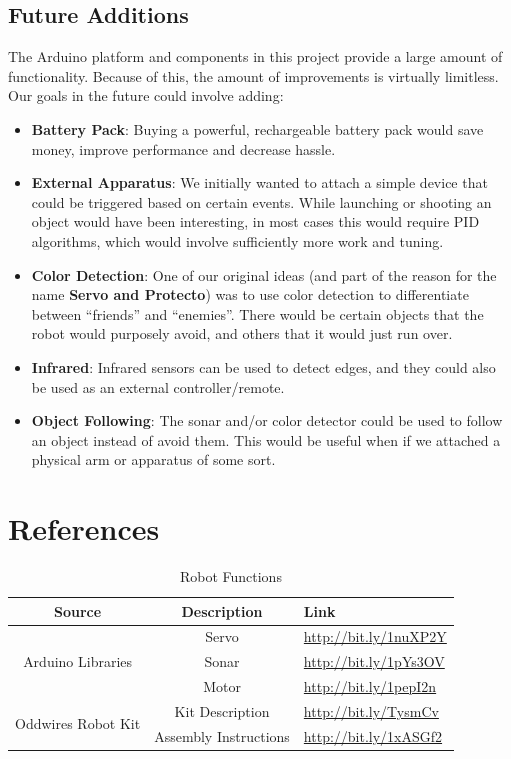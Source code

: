 \documentclass[11pt]{article}
\begin{document}
\subsection{Future Additions}
The Arduino platform and components in this project provide a large amount of functionality.  Because of this, the amount of improvements is virtually limitless.  Our goals in the future could involve adding:
		\begin{itemize}				
		\item \textbf{Battery Pack}: Buying a powerful, rechargeable battery pack would save money, improve performance and decrease hassle.
		\item \textbf{External Apparatus}: We initially wanted to attach a simple device that could be triggered based on certain events.  While launching or shooting an object would have been interesting, in most cases this would require PID algorithms, which would involve sufficiently more work and tuning.
		\item \textbf{Color Detection}: One of our original ideas (and part of the reason for the name \textbf{Servo and Protecto}) was to use color detection to differentiate between ``friends'' and ``enemies''.  There would be certain objects that the robot would purposely avoid, and others that it would just run over.
		\item \textbf{Infrared}: Infrared sensors can be used to detect edges, and they could also be used as an external controller/remote.
		\item \textbf{Object Following}: The sonar and/or color detector could be used to follow an object instead of avoid them.  This would be useful when if we attached a physical arm or apparatus of some sort.
		\end{itemize}


\section{References}

	\begin {table}[h]
	\begin {center} 
	\vspace{15pt}
	
	\begin{tabular}{||c|c|l||}\hline	
		\textbf{Source}	&	\textbf{Description}	&	\textbf{Link}		\\\hline
		\multirow{3}{*}{Arduino Libraries}
						&	Servo		&	\url{http://bit.ly/1nuXP2Y} 		\\
						&	Sonar		&	\url{http://bit.ly/1pYs3OV} 		\\
						&	Motor		&	\url{http://bit.ly/1pepI2n}	 	\\\hline
		\multirow{2}{*}{Oddwires Robot Kit}
						&	Kit Description		&	 \url{http://bit.ly/TysmCv} \\
					&	Assembly Instructions		&	\url{http://bit.ly/1xASGf2} \\\hline

	\end{tabular}
		\caption {Robot Functions} \label{refs}
	\end{center}
	\end{table} 	
\end{document}
